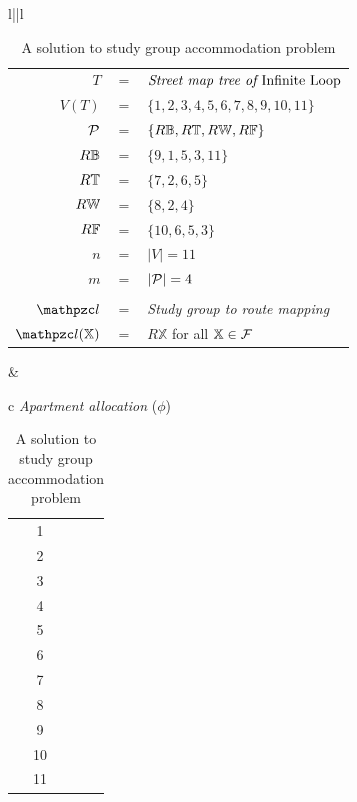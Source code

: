 \documentclass[MS,synopsis]{iitmdiss}
\begin{document}
\begin{table}[htbp]
  \centering
  {\footnotesize    
    \begin{tabular}{l||l}
      \begin{tabular}{rcl}
        $T $&$=$&$ \text{\em Street map tree of {\em Infinite Loop}}$\\
        $V(T) $&$=$&$ \{ 1, 2, 3, 4, 5, 6, 7, 8, 9, 10, 11 \}$\\
        ${\cal P} $&$=$&$ \{R\mathbb{B}, R\mathbb{T}, R\mathbb{W}, R\mathbb{F}\}$\\
        $R\mathbb{B} $&$=$&$ \{9, 1, 5, 3, 11\}$\\
        $R\mathbb{T} $&$=$&$ \{7, 2, 6, 5\}$\\
        $R\mathbb{W} $&$=$&$ \{8, 2, 4 \}$\\
        $R\mathbb{F} $&$=$&$ \{10, 6, 5, 3\}$\\
        $n $&$=$&$ |V| = 11$\\
        $m $&$=$&$ |{\cal P}| = 4$\\\\
        $\cl $&$=$& {\em Study group to route mapping}\\        
        $\cl(\mathbb{X}) $&$=$&  $R\mathbb{X}$ for all $\mathbb{X} \in
        {\cal F}$
      \end{tabular} & 
      \begin{tabular}{c}
       {\em Apartment allocation }($\phi$)\\
                    \begin{tabular}{c|c}                      
                      1  & \xSa\\
                      2  & \xPi\\
                      3  & \xFr\\
                      4  & \xWo\\
                      5  & \xCh\\
                      6  & \xVi\\
                      7  & \xPa\\
                      8  & \xSn\\
                      9  & \xLu\\
                      10 & \xLi\\
                      11 & \xSc                     
                    \end{tabular}
      \end{tabular}\\
    \end{tabular}
  }
  \caption{\figtabsize A solution to study group accommodation problem}
  \label{tab:iltree}
\end{table}
\end{document}
